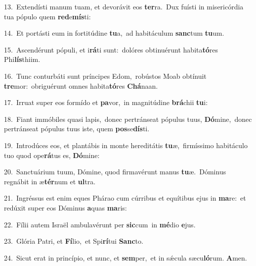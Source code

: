 {\numbfont\textcolor{\numbcolor}{13.}}~Extendísti manum tuam, et devorávit eos \textbf{ter}\-ra.~\star Dux fuísti in misericórdia tua pópulo quem \textbf{red}\-e\-\textbf{mís}\-ti:\par
{\numbfont\textcolor{\numbcolor}{14.}}~Et portásti eum in fortitúdine \textbf{tu}\-a,~\star ad habitáculum \textbf{sanc}\-tum \textbf{tu}\-um.\par
{\numbfont\textcolor{\numbcolor}{15.}}~Ascendérunt pópuli, et i\-\textbf{rá}\-ti sunt:~\star dolóres obtinuérunt habita\-\textbf{tó}\-res Phi\-\textbf{lís}\-thiim.\par
{\numbfont\textcolor{\numbcolor}{16.}}~Tunc conturbáti sunt príncipes Edom,~\dagger robústos Moab obtínuit \textbf{tre}\-mor:~\star obriguérunt omnes habita\-\textbf{tó}\-res \textbf{Chá}\-naan.\par
{\numbfont\textcolor{\numbcolor}{17.}}~Irruat super eos formído et \textbf{pa}\-vor,~\star in magnitúdine \textbf{brá}\-chii \textbf{tu}\-i:\par
{\numbfont\textcolor{\numbcolor}{18.}}~Fiant immóbiles quasi lapis,~\dagger donec pertránseat pópulus tuus, \textbf{Dó}\-mine,~\star donec pertránseat pópulus tuus iste, quem \textbf{pos}\-se\-\textbf{dís}\-ti.\par
{\numbfont\textcolor{\numbcolor}{19.}}~Introdúces eos, et plantábis in monte hereditátis \textbf{tu}\-æ,~\star firmíssimo habitáculo tuo quod ope\-\textbf{rá}\-tus es, \textbf{Dó}\-mine:\par
{\numbfont\textcolor{\numbcolor}{20.}}~Sanctuárium tuum, Dómine, quod firmavérunt manus \textbf{tu}\-æ.~\star Dóminus regnábit in æ\-\textbf{tér}\-num et \textbf{ul}\-tra.\par
{\numbfont\textcolor{\numbcolor}{21.}}~Ingréssus est enim eques Phárao cum cúrribus et equítibus ejus in \textbf{ma}\-re:~\star et redúxit super eos Dóminus \textbf{a}\-quas \textbf{ma}\-ris:\par
{\numbfont\textcolor{\numbcolor}{22.}}~Fílii autem Israël ambulavérunt per \textbf{sic}\-cum~\star in \textbf{mé}\-dio \textbf{e}\-jus.\par
{\numbfont\textcolor{\numbcolor}{23.}}~Glória Patri, et \textbf{Fí}\-lio,~\star et Spi\-\textbf{rí}\-tui \textbf{Sanc}\-to.\par
{\numbfont\textcolor{\numbcolor}{24.}}~Sicut erat in princípio, et nunc, et \textbf{sem}\-per,~\star et in sǽcula sæcu\-\textbf{ló}\-rum. \textbf{A}\-men.\par
